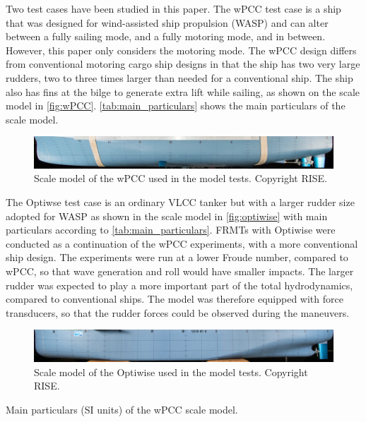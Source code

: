 Two test cases have been studied in this paper. The wPCC test case is a ship that was designed for wind-assisted ship propulsion (WASP) and can alter between a fully sailing mode, and a fully motoring mode, and in between. 
However, this paper only considers the motoring mode. The wPCC design differs from conventional motoring cargo ship designs in that the ship has two very large rudders, two to three times larger than needed for a conventional ship. The ship also has fins at the bilge to generate extra lift while sailing, as shown on the scale model in \autoref{fig:wPCC}.
\autoref{tab:main_particulars} shows the main particulars of the scale model. 
\begin{figure}[h]
    \centering
    \includegraphics[width=\columnwidth]{figures/5m2.jpg}
    \caption{Scale model of the wPCC used in the model tests. Copyright RISE.}
    \label{fig:wPCC}
\end{figure}

The Optiwse test case is an ordinary VLCC tanker but with a larger rudder size adopted for WASP as shown in the scale model in \autoref{fig:optiwise} with main particulars according to \autoref{tab:main_particulars}.
FRMTs with Optiwise were conducted as a continuation of the wPCC experiments, with a more conventional ship design. The experiments were run at a lower Froude number, compared to wPCC, so that wave generation and roll would have smaller impacts. The larger rudder was expected to play a more important part of the total hydrodynamics, compared to conventional ships. The model was therefore equipped with force transducers, so that the rudder forces could be observed during the maneuvers. 
\begin{figure}[h]
    \centering
    \includegraphics[width=\columnwidth]{figures/optiwise.jpg}
    \caption{Scale model of the Optiwise used in the model tests. Copyright RISE.}
    \label{fig:optiwise}
\end{figure}
\begin{table}[h]
    \centering
    \caption{Main particulars (SI units) of the wPCC scale model.}
    \label{tab:main_particulars}
\end{table}